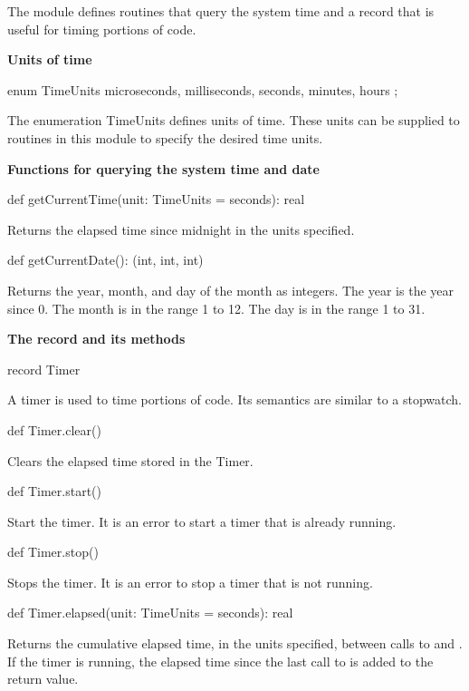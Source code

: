 The module  defines routines that query the system time and
a record  that is useful for timing portions of code.

{\bf Units of time}

\begin{chapel}
enum TimeUnits { microseconds, milliseconds, seconds, minutes, hours };
\end{chapel}
The enumeration TimeUnits defines units of time.  These units can be
supplied to routines in this module to specify the desired time units.

{\bf Functions for querying the system time and date}

\begin{chapel}
def getCurrentTime(unit: TimeUnits = seconds): real
\end{chapel}
Returns the elapsed time since midnight in the units specified.

\begin{chapel}
def getCurrentDate(): (int, int, int)
\end{chapel}
Returns the year, month, and day of the month as integers.  The year
is the year since 0.  The month is in the range 1 to 12.  The day is
in the range 1 to 31.

{\bf The  record and its methods}

\begin{chapel}
record Timer
\end{chapel}
A timer is used to time portions of code.  Its semantics are similar
to a stopwatch.

\begin{chapel}
def Timer.clear()
\end{chapel}
Clears the elapsed time stored in the Timer.

\begin{chapel}
def Timer.start()
\end{chapel}
Start the timer.  It is an error to start a timer that is already
running.

\begin{chapel}
def Timer.stop()
\end{chapel}
Stops the timer.  It is an error to stop a timer that is not running.

\begin{chapel}
def Timer.elapsed(unit: TimeUnits = seconds): real
\end{chapel}
Returns the cumulative elapsed time, in the units specified, between
calls to  and .  If the timer is running, the
elapsed time since the last call to  is added to the
return value.
